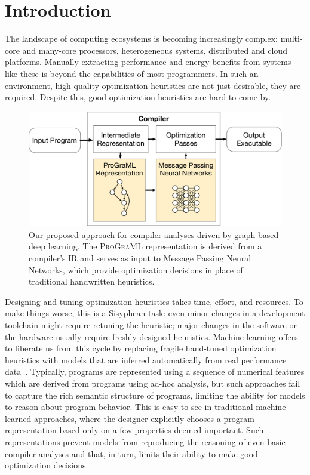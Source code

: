\section{Introduction}

The landscape of computing ecosystems is becoming increasingly
complex: multi-core and many-core processors, heterogeneous systems,
distributed and cloud platforms. Manually extracting performance and
energy benefits from systems like these is beyond the capabilities of
most programmers. In such an environment, high quality optimization
heuristics are not just desirable, they are required. Despite this,
good optimization heuristics are hard to come by.

\begin{figure}
  \centering %
  \includegraphics[width=.65\linewidth]{images/overview}
  \caption{%
    Our proposed approach for compiler analyses driven by graph-based
    deep learning. The \textsc{ProGraML} representation is derived
    from a compiler's IR and serves as input to Message Passing Neural
    Networks, which provide optimization decisions in place of
    traditional handwritten heuristics.%
  }%
  \label{figure:overview}%
\end{figure}

Designing and tuning optimization heuristics takes time, effort, and
resources. To make things worse, this is a Sisyphean task: even minor
changes in a development toolchain might require retuning the
heuristic; major changes in the software or the hardware usually
require freshly designed heuristics. Machine learning offers to
liberate us from this cycle by replacing fragile hand-tuned
optimization heuristics with models that are inferred automatically
from real performance data~\cite{Ashouri2018,Wang2018}. Typically,
programs are represented using a sequence of numerical features which
are derived from programs using ad-hoc analysis, but such approaches
fail to capture the rich semantic structure of programs, limiting the
ability for models to reason about program behavior. This is easy to
see in traditional machine learned approaches, where the designer
explicitly chooses a program representation based only on a few
properties deemed important.  Such representations prevent models from
reproducing the reasoning of even basic compiler analyses and that, in
turn, limits their ability to make good optimization decisions.

